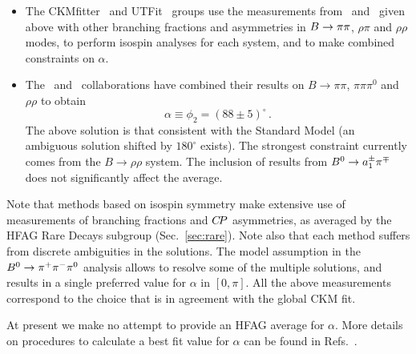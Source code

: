 \begin{itemize}

\item 
  The CKMfitter~\cite{Charles:2004jd} and 
  UTFit~\cite{Bona:2005vz} groups use the measurements 
  from \belle\ and \babar\ given above
  with other branching fractions and \CP asymmetries in 
  $B\to\pi\pi$, $\rho\pi$ and $\rho\rho$ modes, 
  to perform isospin analyses for each system, 
  and to make combined constraints on $\alpha$.

\item
  The \babar\ and \belle\ collaborations have combined their results on $B \to \pi\pi$, $\pi\pi\pi^0$ and $\rho\rho$ to obtain~\cite{Bevan:2014iga}
  \begin{equation}
    \alpha \equiv \phi_2 = (88 \pm 5)^\circ \, .
  \end{equation}
  The above solution is that consistent with the Standard Model (an ambiguous solution shifted by $180^\circ$ exists). The strongest constraint currently comes from the $B \to \rho\rho$ system. The inclusion of results from $B^0 \to a_1^\pm \pi^\mp$ does not significantly affect the average. 

\end{itemize}

Note that methods based on isospin symmetry make extensive use of 
measurements of branching fractions and $C\!P$ asymmetries,
as averaged by the HFAG Rare Decays subgroup (Sec.~\ref{sec:rare}).
Note also that each method suffers from discrete ambiguities in the solutions.
The model assumption in the $B^0 \to \pi^+\pi^-\pi^0$ analysis 
allows to resolve some of the multiple solutions, 
and results in a single preferred value for $\alpha$ in $\left[ 0, \pi \right]$.
All the above measurements correspond to the choice
that is in agreement with the global CKM fit.

At present we make no attempt to provide an HFAG average for $\alpha$.
More details on procedures to calculate a best fit value for $\alpha$ 
can be found in Refs.~\cite{Charles:2004jd,Bona:2005vz}.

\clearpage
{}
\label{sec:cp_uta:cud}

